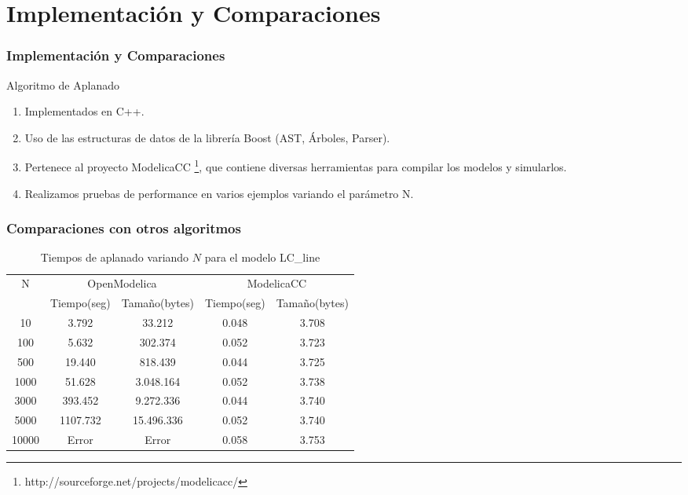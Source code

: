 \section{Implementación y Comparaciones}

\begin{frame}[fragile]
\frametitle{Implementación y Comparaciones} 
\begin{block}{Algoritmo de Aplanado}
\begin{enumerate}
\item Implementados en C++.
\item Uso de las estructuras de datos de la librería Boost (AST, Árboles, Parser).
\item Pertenece al proyecto ModelicaCC  \footnote{http://sourceforge.net/projects/modelicacc/}, que contiene diversas herramientas para compilar los modelos y simularlos. 
\item Realizamos pruebas de performance en varios ejemplos variando el parámetro N.
\end{enumerate}
\end{block}
\end{frame}

\begin{frame}[fragile]
\frametitle{Comparaciones con otros algoritmos}
\begin{table}[ht]
 \centering 
	\begin{tabular}{ | c | c | c | c | c |}
	\hline
	   N  & \multicolumn{2}{|c|}{OpenModelica} & \multicolumn{2}{|c|}{ModelicaCC} \\ \cline{2-5}
				& Tiempo(seg)	& Tamaño(bytes)	& Tiempo(seg)	& Tamaño(bytes) \\ \hline
	   10    	& 3.792  		& 33.212		& 0.048 		& 3.708		\\ \hline
	   100   	& 5.632   	 	& 302.374 		& 0.052    		& 3.723 		\\ \hline
	   500   	& 19.440 		& 818.439 		& 0.044    		& 3.725 		\\ \hline
	   1000  	& 51.628 		& 3.048.164	 	& 0.052	 		& 3.738		\\ \hline
	   3000  	& 393.452 		& 9.272.336		& 0.044	 		& 3.740		\\ \hline
	   5000  	& 1107.732 		& 15.496.336	& 0.052	 		& 3.740		\\ \hline
	   10000 	& Error			& Error			& 0.058			& 3.753		\\ \hline
	\end{tabular}	 
	\caption{Tiempos de aplanado variando $N$ para el modelo LC\_line }
\end{table}
\end{frame}

